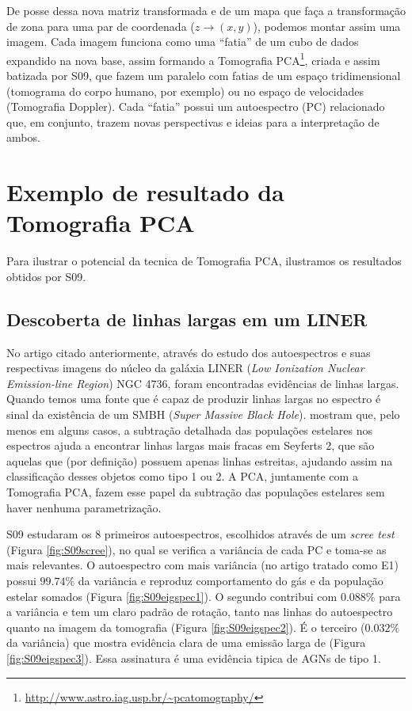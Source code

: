 De posse dessa nova matriz transformada e de um mapa que faça a transformação de zona para uma par de coordenada ($z \to
(x, y)$), podemos montar assim uma imagem. Cada imagem funciona como uma ``fatia'' de um cubo de dados expandido na nova
base, assim formando a Tomografia PCA\footnote{\url{http://www.astro.iag.usp.br/~pcatomography/}}, criada e assim
batizada por S09, que fazem um paralelo com fatias de um espaço tridimensional (tomograma do corpo humano, por exemplo)
ou no espaço de velocidades (Tomografia Doppler). Cada ``fatia'' possui um autoespectro (PC) relacionado que, em
conjunto, trazem novas perspectivas e ideias para a interpretação de ambos.

\section{Exemplo de resultado da Tomografia PCA}

Para ilustrar o potencial da tecnica de Tomografia PCA, ilustramos os resultados obtidos por S09.

\subsection{Descoberta de linhas largas em um LINER}

No artigo citado anteriormente, através do estudo dos autoespectros e suas respectivas imagens do núcleo da galáxia
LINER ({\em Low Ionization Nuclear Emission-line Region}) NGC 4736, foram encontradas evidências de linhas largas.
Quando temos uma fonte que é capaz de produzir linhas largas no espectro é sinal da existência de um SMBH ({\em Super
Massive Black Hole}). \citet{CidFernandes2004} mostram que, pelo menos em alguns casos, a subtração detalhada das
populações estelares nos espectros ajuda a encontrar linhas largas mais fracas em Seyferts 2, que são aquelas que (por
definição) possuem apenas linhas estreitas, ajudando assim na classificação desses objetos como tipo 1 ou 2. A PCA,
juntamente com a Tomografia PCA, fazem esse papel da subtração das populações estelares sem haver nenhuma
parametrização.

S09 estudaram os 8 primeiros autoespectros, escolhidos através de um {\em scree test} (Figura \ref{fig:S09scree}),
no qual se verifica a variância de cada PC e toma-se as mais relevantes. O autoespectro com mais variância (no artigo
tratado como E1) possui $99.74\%$ da variância e reproduz comportamento do gás e da população estelar somados (Figura
\ref{fig:S09eigspec1}). O segundo contribui com $0.088\%$ para a variância e tem um claro padrão de rotação, tanto
nas linhas do autoespectro quanto na imagem da tomografia (Figura \ref{fig:S09eigspec2}). É o terceiro ($0.032\%$
da variância) que mostra evidência clara de uma emissão larga de \Halpha (Figura \ref{fig:S09eigspec3}). Essa
assinatura é uma evidência tipica de AGNs de tipo 1.

